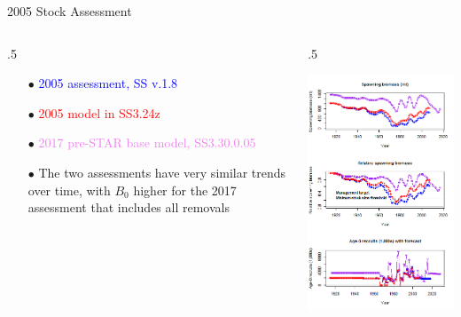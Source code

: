 \documentclass[ignorenonframetext,compress]{beamer}
\def\begincols{\begin{columns}}
\def\begincol{\begin{column}}
\def\endcol{\end{column}}
\def\endcols{\end{columns}}
\begin{document}
\begin{frame}{2005 Stock Assessment}

\begincols
 \begincol{.5\textwidth}

\begin{itemize}
\item[$\bullet$] \textcolor{blue}{2005 assessment, SS v.1.8}
\item[$\bullet$] \textcolor{red}{2005 model in SS3.24z}
\item[$\bullet$] \textcolor{violet}{2017 pre-STAR base model, SS3.30.0.05}
\item[$\bullet$] The two assessments have very similar trends over time, with $B_0$ higher for the 2017 assessment that includes all removals
\end{itemize}

\endcol
 \begincol{.5\textwidth}

\includegraphics{Figures/bridge_timeseries.png}

\endcol
\endcols

\end{frame}
\end{document}
